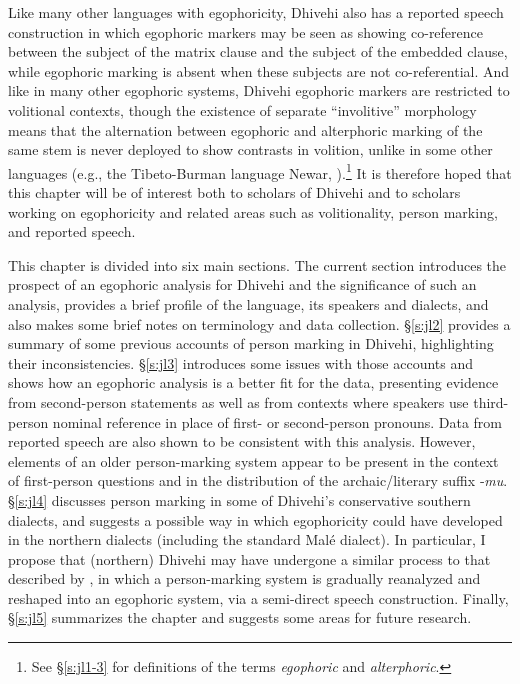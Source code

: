 \documentclass[output=paper]{langsci/langscibook}
\begin{document}
Like many other languages with egophoricity, Dhivehi also has a reported speech construction in which egophoric markers may be seen as showing co-reference between the subject of the matrix clause and the subject of the embedded clause, while egophoric marking is absent when these subjects are not co-referential. And like in many other egophoric systems, Dhivehi egophoric markers are restricted to volitional contexts, though the existence of separate “involitive” morphology means that the alternation between egophoric and alterphoric marking of the same stem is never deployed to show contrasts in volition, unlike in some other languages (e.g., the Tibeto-Burman language Newar, \citealt{Hale1980}).\footnote{See §‎\ref{s:jl1-3} for definitions of the terms \textit{egophoric} and \textit{alterphoric}.} It is therefore hoped that this chapter will be of interest both to scholars of Dhivehi and to scholars working on egophoricity and related areas such as volitionality, person marking, and reported speech.

This chapter is divided into six main sections. The current section introduces the prospect of an egophoric analysis for Dhivehi and the significance of such an analysis, provides a brief profile of the language, its speakers and dialects, and also makes some brief notes on terminology and data collection. §‎\ref{s:jl2} provides a summary of some previous accounts of person marking in Dhivehi, highlighting their inconsistencies. §‎\ref{s:jl3} introduces some issues with those accounts and shows how an egophoric analysis is a better fit for the data, presenting evidence from second-person statements as well as from contexts where speakers use third-person nominal reference in place of first- or second-person pronouns. Data from reported speech are also shown to be consistent with this analysis. However, elements of an older person-marking system appear to be present in the context of first-person questions and in the distribution of the archaic/literary suffix ‑\textit{mu}. §\ref{s:jl4} discusses person marking in some of Dhivehi’s conservative southern dialects, and suggests a possible way in which egophoricity could have developed in the northern dialects (including the standard Malé dialect). In particular, I propose that (northern) Dhivehi may have undergone a similar process to that described by \cite{WidmerZemp2017}, in which a person-marking system is gradually reanalyzed and reshaped into an egophoric system, via a semi-direct speech construction. Finally, §‎\ref{s:jl5} summarizes the chapter and suggests some areas for future research.
\end{document}
